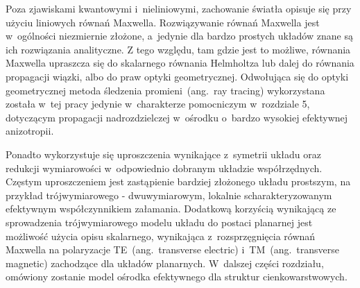 
Poza zjawiskami kwantowymi i~nieliniowymi, zachowanie światła opisuje się przy użyciu liniowych równań Maxwella. Rozwiązywanie równań Maxwella jest w~ogólności niezmiernie złożone, a~jedynie dla bardzo prostych układów znane są ich rozwiązania analityczne. Z tego względu, tam gdzie jest to możliwe, równania Maxwella upraszcza się do skalarnego równania Helmholtza lub dalej do równania propagacji wiązki, albo do praw optyki geometrycznej. Odwołująca się do optyki geometrycznej metoda śledzenia promieni~(ang.~ray tracing) wykorzystana została w~tej pracy jedynie w~charakterze pomocniczym w~rozdziale 5, dotyczącym propagacji nadrozdzielczej w~ośrodku o~bardzo wysokiej efektywnej anizotropii. 

Ponadto wykorzystuje się uproszczenia wynikające z~symetrii układu oraz redukcji wymiarowości w~odpowiednio dobranym układzie współrzędnych. Częstym uproszczeniem jest zastąpienie bardziej złożonego układu prostszym, na przykład trójwymiarowego - dwuwymiarowym, lokalnie scharakteryzowanym efektywnym współczynnikiem załamania. Dodatkową korzyścią wynikającą ze sprowadzenia trójwymiarowego modelu układu do postaci planarnej jest możliwość użycia opisu skalarnego, wynikająca z~rozsprzęgnięcia równań Maxwella na polaryzacje TE~(ang.~transverse electric) i~TM~(ang.~transverse magnetic) zachodzące dla układów planarnych. W~dalszej części rozdziału, omówiony zostanie model ośrodka efektywnego dla struktur cienkowarstwowych.

